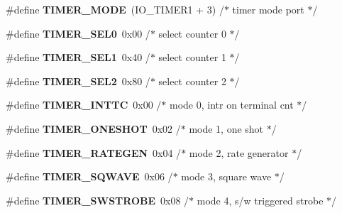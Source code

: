 \begin{DoxyCompactItemize}
\#define {\bfseries T\+I\+M\+E\+R\+\_\+\+M\+O\+DE}~(I\+O\+\_\+\+T\+I\+M\+E\+R1 + 3) /$\ast$ timer mode port                $\ast$/
\item 
\mbox{\label{group__RTEMSBSPsI386_ga6a4822642d40c248435692324a818010}} 
\#define {\bfseries T\+I\+M\+E\+R\+\_\+\+S\+E\+L0}~0x00            /$\ast$ select counter 0               $\ast$/
\item 
\mbox{\label{group__RTEMSBSPsI386_ga8349623fd8d99f9cc5d8ae29d78594fc}} 
\#define {\bfseries T\+I\+M\+E\+R\+\_\+\+S\+E\+L1}~0x40            /$\ast$ select counter 1               $\ast$/
\item 
\mbox{\label{group__RTEMSBSPsI386_ga142a255de0dbc48aeabd45fc10c33672}} 
\#define {\bfseries T\+I\+M\+E\+R\+\_\+\+S\+E\+L2}~0x80            /$\ast$ select counter 2               $\ast$/
\item 
\mbox{\label{group__RTEMSBSPsI386_ga442fcd61bb574482c52504331ac6db7e}} 
\#define {\bfseries T\+I\+M\+E\+R\+\_\+\+I\+N\+T\+TC}~0x00            /$\ast$ mode 0, intr on terminal cnt   $\ast$/
\item 
\mbox{\label{group__RTEMSBSPsI386_ga2e4ab1f1f27343eeb9e2f2caf27bea01}} 
\#define {\bfseries T\+I\+M\+E\+R\+\_\+\+O\+N\+E\+S\+H\+OT}~0x02            /$\ast$ mode 1, one shot               $\ast$/
\item 
\mbox{\label{group__RTEMSBSPsI386_gad9659e4ad696f017ad5002e4d4e9d176}} 
\#define {\bfseries T\+I\+M\+E\+R\+\_\+\+R\+A\+T\+E\+G\+EN}~0x04            /$\ast$ mode 2, rate generator         $\ast$/
\item 
\mbox{\label{group__RTEMSBSPsI386_ga8971939b4cac5a5abbd0996dbca6d6be}} 
\#define {\bfseries T\+I\+M\+E\+R\+\_\+\+S\+Q\+W\+A\+VE}~0x06            /$\ast$ mode 3, square wave            $\ast$/
\item 
\mbox{\label{group__RTEMSBSPsI386_ga235efb114dc2978cd3cfc6842b1e6e73}} 
\#define {\bfseries T\+I\+M\+E\+R\+\_\+\+S\+W\+S\+T\+R\+O\+BE}~0x08            /$\ast$ mode 4, s/w triggered strobe   $\ast$/
\item 

\end{DoxyCompactItemize}
